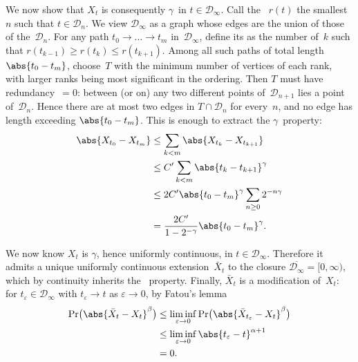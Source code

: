 We now show that $X_t$ is consequently $\gamma$\dashHolder\
in \( t \in \mathcal D_\infty \).
Call the ~$r(t)$
the smallest~$n$ such that \( t \in \mathcal D_n \).
We view $\mathcal D_\infty$ as a graph
whose edges are the union of those of the~$\mathcal D_n$.
For any path \( t_0 \to\dots\to t_m \) in~$\mathcal D_\infty$,
define its  as the number of~$k$
such that \( r(t_{k-1}) \ge r(t_k) \le r(t_{k+1}) \).
Among all such paths of total length \( \abs{t_0-t_m} \),
choose~$T$ with the minimum number of vertices of each rank,
with larger ranks being most significant in the ordering.
Then $T$ must have redundancy~$=0$:
between (or on) any two different points of~$\mathcal D_{n+1}$
lies a point of~$\mathcal D_n$.
Hence there are at most two edges in \( T \cap \mathcal D_n \) for every~$n$,
and no edge has length exceeding \( \abs{t_0-t_m} \).
This is enough to extract the $\gamma$\dashHolder\ property:
\begin	{align*}
	\abs{X_{t_0} - X_{t_m}}
	&\le	\sum_{k<m} \abs{X_{t_k} - X_{t_{k+1}}} \\
	&\le	C'\sum_{k<m} \abs{t_k - t_{k+1}}^\gamma \\
	&\le	2C'\abs{t_0 - t_m}^\gamma \sum_{n \ge 0} 2^{-n\gamma} \\
	&=	\frac{2C'}{1-2^{-\gamma}} \abs{t_0 - t_m}^\gamma \text.
\end	{align*}

We now know $X_t$ is $\gamma$\dashHolder, hence uniformly continuous,
in \( t \in \mathcal D_\infty \).
Therefore it admits a unique uniformly continuous extension~$\bar X_t$
to the closure \( \overline{\mathcal D_\infty} = [0,\infty) \),
which by continuity inherits the \Holder\ property.
Finally, $\bar X_t$ is a modification of~$X_t$:
for \( t_\varepsilon \in \mathcal D_\infty \)
with \( t_\varepsilon \to t \) as \( \varepsilon \to 0 \),
by Fatou's lemma
\begin	{align*}
	\Pr\bigl( \abs{\bar X_t - X_t}^\beta \bigr)
	&\le	\liminf_{\varepsilon \to 0}
		\Pr\bigl( \abs{\bar X_{t_\varepsilon} - X_t}^\beta \bigr) \\
	&\le	\liminf_{\varepsilon \to 0}
		\abs{t_\varepsilon - t}^{\alpha+1} \\
	&=	0 \text.
\end	{align*}
